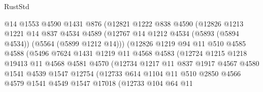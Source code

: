 \begin{lexlean}{RustStd}
\begin{coremodule}
                        @14
                        @1553
                        @4590
                        @1431
                        @876
                        (@12821
                          @1222
                          @838
                          @4590
                          (@12826
                            @1213
                            @1221
                            @14
                            @837
                            @4534
                            @4589
                            (@12767 @14 @1212 @4534 (@5893 (@5894 @4534)) (@5564 (@5899 @1212 @14)))
                            (@12826
                              @1219
                              @94
                              @11
                              @510
                              @4585
                              @4588
                              (@5496
                                @7624
                                @1431
                                @1219
                                @11
                                @4568
                                @4583
                                (@12724
                                  @1215
                                  @1218
                                  @19413
                                  @11
                                  @4568
                                  @4581
                                  @4570
                                  (@12734
                                    @1217
                                    @11
                                    @837
                                    @1917
                                    @4567
                                    @4580
                                    @1541
                                    @4539
                                    @1547
                                    @12754
                                    (@12733
                                      @614
                                      @1104
                                      @11
                                      @510
                                      @2850
                                      @4566
                                      @4579
                                      @1541
                                      @4549
                                      @1547
                                      @17018
                                      (@12733
                                        @104
                                        @64
                                        @11

\end{coremodule}
\end{lexlean}
